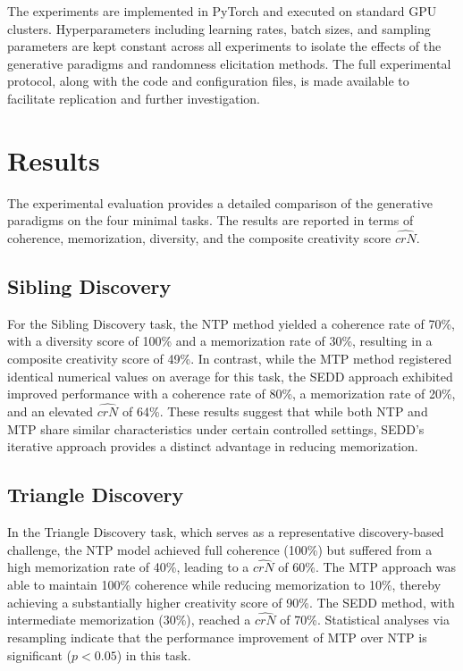 \documentclass[12pt]{article}
\begin{document}
The experiments are implemented in PyTorch and executed on standard GPU clusters. Hyperparameters including learning rates, batch sizes, and sampling parameters are kept constant across all experiments to isolate the effects of the generative paradigms and randomness elicitation methods. The full experimental protocol, along with the code and configuration files, is made available to facilitate replication and further investigation.

\section{Results}
The experimental evaluation provides a detailed comparison of the generative paradigms on the four minimal tasks. The results are reported in terms of coherence, memorization, diversity, and the composite creativity score \(\hat{crN}\).

\subsection*{Sibling Discovery}
For the Sibling Discovery task, the NTP method yielded a coherence rate of 70\%, with a diversity score of 100\% and a memorization rate of 30\%, resulting in a composite creativity score of 49\%. In contrast, while the MTP method registered identical numerical values on average for this task, the SEDD approach exhibited improved performance with a coherence rate of 80\%, a memorization rate of 20\%, and an elevated \(\hat{crN}\) of 64\%. These results suggest that while both NTP and MTP share similar characteristics under certain controlled settings, SEDD’s iterative approach provides a distinct advantage in reducing memorization.

\subsection*{Triangle Discovery}
In the Triangle Discovery task, which serves as a representative discovery-based challenge, the NTP model achieved full coherence (100\%) but suffered from a high memorization rate of 40\%, leading to a \(\hat{crN}\) of 60\%. The MTP approach was able to maintain 100\% coherence while reducing memorization to 10\%, thereby achieving a substantially higher creativity score of 90\%. The SEDD method, with intermediate memorization (30\%), reached a \(\hat{crN}\) of 70\%. Statistical analyses via resampling indicate that the performance improvement of MTP over NTP is significant (\(p < 0.05\)) in this task.
\end{document}
